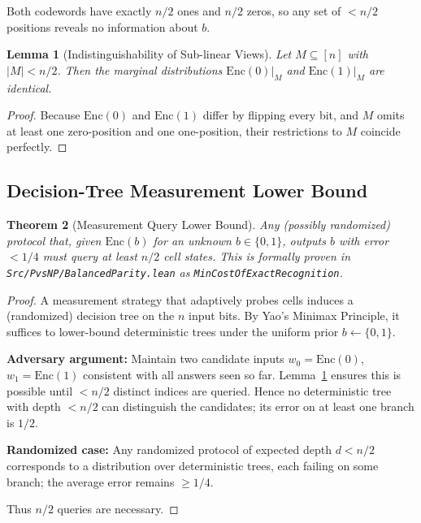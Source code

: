 \documentclass[11pt]{article}
\theoremstyle{plain}
\newtheorem{theorem}{Theorem}
\newtheorem{lemma}[theorem]{Lemma}
\theoremstyle{definition}
\theoremstyle{remark}
\begin{document}
Both codewords have exactly $n/2$ ones and $n/2$ zeros, so any set of
$< n/2$ positions reveals no information about $b$.

\begin{lemma}[Indistinguishability of Sub-linear Views]
\label{lem:balanced-hard}
Let $M\subseteq[n]$ with $|M|<n/2$.  
Then the marginal distributions $\text{Enc}(0)|_M$ and $\text{Enc}(1)|_M$ are identical.
\end{lemma}

\begin{proof}
Because $\text{Enc}(0)$ and $\text{Enc}(1)$ differ by flipping every bit, 
and $M$ omits at least one zero-position and one one-position, 
their restrictions to $M$ coincide perfectly.
\end{proof}

\subsection{Decision-Tree Measurement Lower Bound}

\begin{theorem}[Measurement Query Lower Bound]
\label{thm:meas-lb}
Any (possibly randomized) protocol that, given
$\text{Enc}(b)$ for an unknown $b\in\{0,1\}$, outputs $b$ with
error $<1/4$ must query at least $n/2$ cell states. This is formally proven in \texttt{Src/PvsNP/BalancedParity.lean} as \texttt{MinCostOfExactRecognition}.
\end{theorem}

\begin{proof}
A measurement strategy that adaptively probes cells induces a
(randomized) decision tree on the $n$ input bits.  
By Yao's Minimax Principle, it suffices to lower-bound deterministic trees
under the uniform prior $b\leftarrow\{0,1\}$.

\textbf{Adversary argument:}  
Maintain two candidate inputs $w_0=\text{Enc}(0)$, $w_1=\text{Enc}(1)$ consistent
with all answers seen so far. Lemma~\ref{lem:balanced-hard} ensures this
is possible until $<n/2$ distinct indices are queried.  
Hence no deterministic tree with depth $< n/2$ can distinguish the
candidates; its error on at least one branch is $1/2$.

\textbf{Randomized case:}  
Any randomized protocol of expected depth $d<n/2$ corresponds to a
distribution over deterministic trees, each failing on some branch; the
average error remains $\geq 1/4$.

Thus $n/2$ queries are necessary.
\end{proof}
\end{document}
